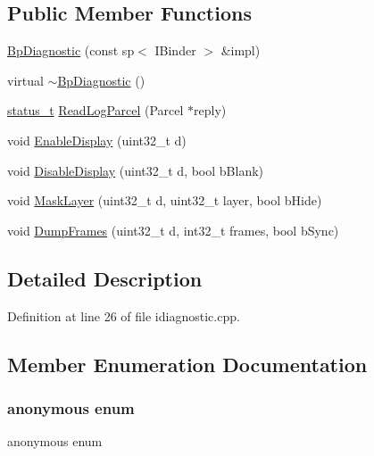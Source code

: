 \subsection*{Public Member Functions}
\begin{DoxyCompactItemize}
\item 
\mbox{\hyperlink{classhwcomposer_1_1BpDiagnostic_a9b239ac429056be616b4b25165305f96}{Bp\+Diagnostic}} (const sp$<$ I\+Binder $>$ \&impl)
\item 
virtual \mbox{\hyperlink{classhwcomposer_1_1BpDiagnostic_acc1b84dc32dab5d5c6096f9c67321616}{$\sim$\+Bp\+Diagnostic}} ()
\item 
\mbox{\hyperlink{hwcserviceapi_8h_a3806fb2027d9a316d8ca8d9b8b8eb96f}{status\+\_\+t}} \mbox{\hyperlink{classhwcomposer_1_1BpDiagnostic_ae3799943fdcbef492341ca045511889c}{Read\+Log\+Parcel}} (Parcel $\ast$reply)
\item 
void \mbox{\hyperlink{classhwcomposer_1_1BpDiagnostic_a8478499ae7697d9e568393b2a882cec3}{Enable\+Display}} (uint32\+\_\+t d)
\item 
void \mbox{\hyperlink{classhwcomposer_1_1BpDiagnostic_a71a67b4621b8281bb24a88a333af15bf}{Disable\+Display}} (uint32\+\_\+t d, bool b\+Blank)
\item 
void \mbox{\hyperlink{classhwcomposer_1_1BpDiagnostic_ad80a8de0c5d66eaa67082332aecdf9b9}{Mask\+Layer}} (uint32\+\_\+t d, uint32\+\_\+t layer, bool b\+Hide)
\item 
void \mbox{\hyperlink{classhwcomposer_1_1BpDiagnostic_ab42faca0919c71e8c3e451ee9c543916}{Dump\+Frames}} (uint32\+\_\+t d, int32\+\_\+t frames, bool b\+Sync)
\end{DoxyCompactItemize}


\subsection{Detailed Description}


Definition at line 26 of file idiagnostic.\+cpp.



\subsection{Member Enumeration Documentation}
\mbox{\label{classhwcomposer_1_1BpDiagnostic_a28475ea102b977cb7213262dc96a568d}} 
\subsubsection{\texorpdfstring{anonymous enum}{anonymous enum}}
{\footnotesize\ttfamily anonymous enum}


